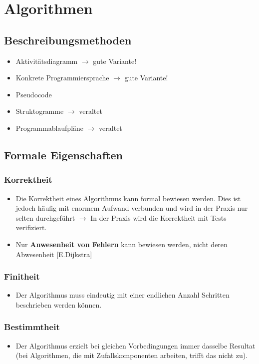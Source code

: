 \section{Algorithmen}

\subsection{Beschreibungsmethoden}
\begin{itemize}
	\item Aktivitätsdiagramm $\rightarrow$ gute Variante!
	\item Konkrete Programmiersprache $\rightarrow$ gute Variante!
	\item Pseudocode
	\item Struktogramme $\rightarrow$ veraltet
	\item Programmablaufpläne $\rightarrow$ veraltet
\end{itemize}

\subsection{Formale Eigenschaften}
\subsubsection{Korrektheit}
    \begin{itemize}
	    \item Die Korrektheit eines Algorithmus kann formal bewiesen werden. Dies ist jedoch häufig mit enormem Aufwand verbunden und wird in der Praxis nur selten durchgeführt $\rightarrow$ In der Praxis wird die Korrektheit mit Tests verifiziert.
	    \item Nur \textbf{Anwesenheit von Fehlern} kann bewiesen werden, nicht deren Abwesenheit [E.Dijkstra]
    \end{itemize}
\subsubsection{Finitheit}
    \begin{itemize}
	    \item Der Algorithmus muss eindeutig mit einer endlichen Anzahl Schritten beschrieben werden können.
    \end{itemize}
\subsubsection{Bestimmtheit}
    \begin{itemize}
	    \item Der Algorithmus erzielt bei gleichen Vorbedingungen immer dasselbe Resultat (bei Algorithmen, die mit Zufallskomponenten arbeiten, trifft das nicht zu).
    \end{itemize}

